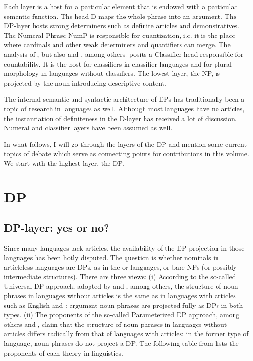 \documentclass[output=paper]{langscibook}
\begin{document}
Each layer is a host for a particular element that is endowed with a particular semantic function. The head D maps the whole phrase into an argument. The DP-layer hosts strong determiners such as definite articles and demonstratives. The Numeral Phrase NumP is responsible for quantization, i.e. it is the place where cardinals and other weak determiners and quantifiers can merge. The analysis of \citet{Borer2005}, but also \citet{Cheng.Heycock2017} and \citet{Cheng.Sybesma1999}, among others, posits a Classifier head responsible for countability. It is the host for classifiers in classifier languages and for plural morphology in languages without classifiers. The lowest layer, the NP, is projected by the noun introducing descriptive content.

The internal semantic and syntactic architecture of DPs has traditionally been a topic of research in  languages as well. Although most  languages have no articles, the instantiation of definiteness in the D-layer has received a lot of discussion. Numeral and classifier layers have been assumed as well.

In what follows, I will go through the layers of the DP and mention some current topics of debate which serve as connecting points for contributions in this volume. We start with the highest layer, the DP.

\section{DP}
\subsection{DP-layer: yes or no?}

Since many  languages lack articles, the availability of the DP projection in those languages has been hotly disputed. The question is whether nominals in articleless  languages are DPs, as in the  or  languages, or bare NPs (or possibly intermediate structures). There are three views: (i) According to the so-called Universal DP approach, adopted by \citet{Longobardi1994} and \citet{Matthewson1998}, among others, the structure of noun phrases in languages without articles is the same as in languages with articles such as English and : argument noun phrases are projected fully as DPs in both types. (ii) The proponents of the so-called Parameterized DP approach, among others \citet{Chierchia1998} and \citet{Baker2003}, claim that the structure of noun phrases in languages without articles differs radically from that of languages with articles: in the former type of language, noun phrases do not project a DP. The following table from \citet{Veselovska2014} lists the proponents of each theory in  linguistics.
\end{document}
